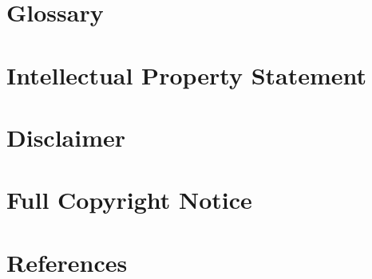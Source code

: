 \documentclass[10pt,a4paper]{article}
\begin{document}
%
%
%
%
%
%
%
%
% 
%
%
%
%

\section{Glossary}
\label{sec:glossary}


\section{Intellectual Property Statement}


\section{Disclaimer}


\section{Full Copyright Notice}


\section{References}



\end{document}

